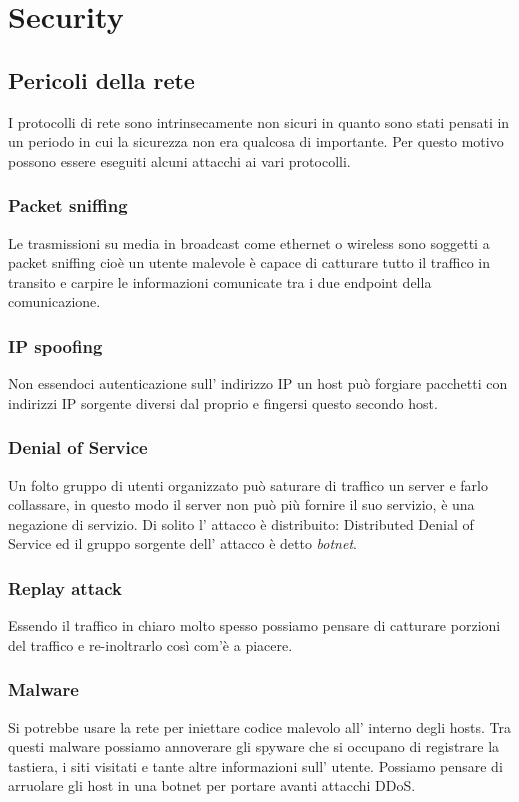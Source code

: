 \section{Security}
\subsection{Pericoli della rete}
I protocolli di rete sono intrinsecamente non sicuri in quanto sono stati pensati in un periodo in cui la sicurezza non era qualcosa di importante.
Per questo motivo possono essere eseguiti alcuni attacchi ai vari protocolli.

\subsubsection{Packet sniffing}
Le trasmissioni su media in broadcast come ethernet o wireless sono soggetti a packet sniffing cioè un utente malevole è capace di catturare tutto il traffico in transito e carpire le informazioni comunicate tra i due endpoint della comunicazione.

\subsubsection{IP spoofing}
Non essendoci autenticazione sull' indirizzo IP un host può forgiare pacchetti con indirizzi IP sorgente diversi dal proprio e fingersi questo secondo host.

\subsubsection{Denial of Service}
Un folto gruppo di utenti organizzato può saturare di traffico un server e farlo collassare, in questo modo il server non può più fornire il suo servizio, è una negazione di servizio.
Di solito l' attacco è distribuito: Distributed Denial of Service ed il gruppo sorgente dell' attacco è detto \emph{botnet}.

\subsubsection{Replay attack}
Essendo il traffico in chiaro molto spesso possiamo pensare di catturare porzioni del traffico e re-inoltrarlo così com'è a piacere.

\subsubsection{Malware}
Si potrebbe usare la rete per iniettare codice malevolo all' interno degli hosts.
Tra questi malware possiamo annoverare gli spyware che si occupano di registrare la tastiera, i siti visitati e tante altre informazioni sull' utente.
Possiamo pensare di arruolare gli host in una botnet per portare avanti attacchi DDoS.

